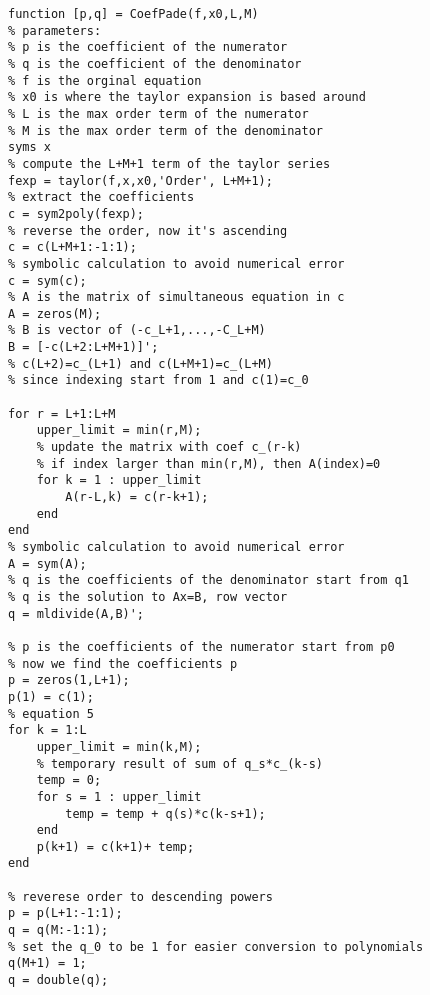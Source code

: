 \lstset{basicstyle=\footnotesize,style=myCustomMatlabStyle}
\begin{lstlisting}
function [p,q] = CoefPade(f,x0,L,M)
% parameters:
% p is the coefficient of the numerator
% q is the coefficient of the denominator
% f is the orginal equation
% x0 is where the taylor expansion is based around
% L is the max order term of the numerator
% M is the max order term of the denominator
syms x
% compute the L+M+1 term of the taylor series
fexp = taylor(f,x,x0,'Order', L+M+1);
% extract the coefficients
c = sym2poly(fexp);
% reverse the order, now it's ascending
c = c(L+M+1:-1:1);
% symbolic calculation to avoid numerical error
c = sym(c);
% A is the matrix of simultaneous equation in c
A = zeros(M);
% B is vector of (-c_L+1,...,-C_L+M) 
B = [-c(L+2:L+M+1)]';    
% c(L+2)=c_(L+1) and c(L+M+1)=c_(L+M)
% since indexing start from 1 and c(1)=c_0

for r = L+1:L+M
    upper_limit = min(r,M);
    % update the matrix with coef c_(r-k)
    % if index larger than min(r,M), then A(index)=0
    for k = 1 : upper_limit
        A(r-L,k) = c(r-k+1);
    end
end
% symbolic calculation to avoid numerical error
A = sym(A);
% q is the coefficients of the denominator start from q1
% q is the solution to Ax=B, row vector
q = mldivide(A,B)';

% p is the coefficients of the numerator start from p0
% now we find the coefficients p
p = zeros(1,L+1);
p(1) = c(1);
% equation 5
for k = 1:L
    upper_limit = min(k,M);
    % temporary result of sum of q_s*c_(k-s)
    temp = 0;
    for s = 1 : upper_limit
        temp = temp + q(s)*c(k-s+1);
    end
    p(k+1) = c(k+1)+ temp;
end

% reverese order to descending powers
p = p(L+1:-1:1);
q = q(M:-1:1);
% set the q_0 to be 1 for easier conversion to polynomials
q(M+1) = 1;
q = double(q);

\end{lstlisting}
